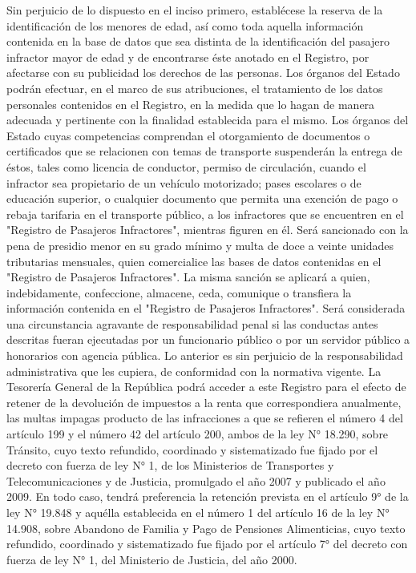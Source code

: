     Sin perjuicio de lo dispuesto en el inciso primero, establécese la reserva de la identificación de los menores de edad, así como toda aquella información contenida en la base de datos que sea distinta de la identificación del pasajero infractor mayor de edad y de encontrarse éste anotado en el Registro, por afectarse con su publicidad los derechos de las personas.
    Los órganos del Estado podrán efectuar, en el marco de sus atribuciones, el tratamiento de los datos personales contenidos en el Registro, en la medida que lo hagan de manera adecuada y pertinente con la finalidad establecida para el mismo.
    Los órganos del Estado cuyas competencias comprendan el otorgamiento de documentos o certificados que se relacionen con temas de transporte suspenderán la entrega de éstos, tales como licencia de conductor, permiso de circulación, cuando el infractor sea propietario de un vehículo motorizado; pases escolares o de educación superior, o cualquier documento que permita una exención de pago o rebaja tarifaria en el transporte público, a los infractores que se encuentren en el "Registro de Pasajeros Infractores", mientras figuren en él.
    Será sancionado con la pena de presidio menor en su grado mínimo y multa de doce a veinte unidades tributarias mensuales, quien comercialice las bases de datos contenidas en el "Registro de Pasajeros Infractores". La misma sanción se aplicará a quien, indebidamente, confeccione, almacene, ceda, comunique o transfiera la información contenida en el "Registro de Pasajeros Infractores". Será considerada una circunstancia agravante de responsabilidad penal si las conductas antes descritas fueran ejecutadas por un funcionario público o por un servidor público a honorarios con agencia pública. Lo anterior es sin perjuicio de la responsabilidad administrativa que les cupiera, de conformidad con la normativa vigente.
    La Tesorería General de la República podrá acceder a este Registro para el efecto de retener de la devolución de impuestos a la renta que correspondiera anualmente, las multas impagas producto de las infracciones a que se refieren el número 4 del artículo 199 y el número 42 del artículo 200, ambos de la ley N° 18.290, sobre Tránsito, cuyo texto refundido, coordinado y sistematizado fue fijado por el decreto con fuerza de ley N° 1, de los Ministerios de Transportes y Telecomunicaciones y de Justicia, promulgado el año 2007 y publicado el año 2009. En todo caso, tendrá preferencia la retención prevista en el artículo 9° de la ley N° 19.848 y aquélla establecida en el número 1 del artículo 16 de la ley N° 14.908, sobre Abandono de Familia y Pago de Pensiones Alimenticias, cuyo texto refundido, coordinado y sistematizado fue fijado por el artículo 7° del decreto con fuerza de ley N° 1, del Ministerio de Justicia, del año 2000.
